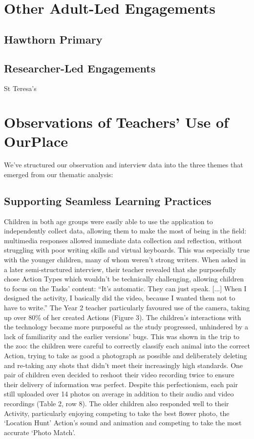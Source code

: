 \section{Other Adult-Led Engagements}

\subsection{Hawthorn Primary}

\subsection{Researcher-Led Engagements}

St Teresa's

\section{Observations of Teachers' Use of OurPlace}

We’ve structured our observation and interview data into the three themes that emerged from our thematic analysis:

\subsection{Supporting Seamless Learning Practices}

Children in both age groups were easily able to use the application to independently collect data, allowing them to make the most of being in the field: multimedia responses allowed immediate data collection and reflection, without struggling with poor writing skills and virtual keyboards. This was especially true with the younger children, many of whom weren’t strong writers. When asked in a later semi-structured interview, their teacher revealed that she purposefully chose Action Types which wouldn’t be technically challenging, allowing children to focus on the Tasks’ content: “It’s automatic. They can just speak. [...] When I designed the activity, I basically did the video, because I wanted them not to have to write.” The Year 2 teacher particularly favoured use of the camera, taking up over 80\% of her created Actions (Figure 3). The children’s interactions with the technology became more purposeful as the study progressed, unhindered by a lack of familiarity and the earlier versions’ bugs. This was shown in the trip to the zoo: the children were careful to correctly classify each animal into the correct Action, trying to take as good a photograph as possible and deliberately deleting and re-taking any shots that didn’t meet their increasingly high standards. One pair of children even decided to reshoot their video recording twice to ensure their delivery of information was perfect. Despite this perfectionism, each pair still uploaded over 14 photos on average in addition to their audio and video recordings (Table 2, row 8). The older children also responded well to their Activity, particularly enjoying competing to take the best flower photo, the ‘Location Hunt’ Action’s sound and animation and competing to take the most accurate ‘Photo Match’.

